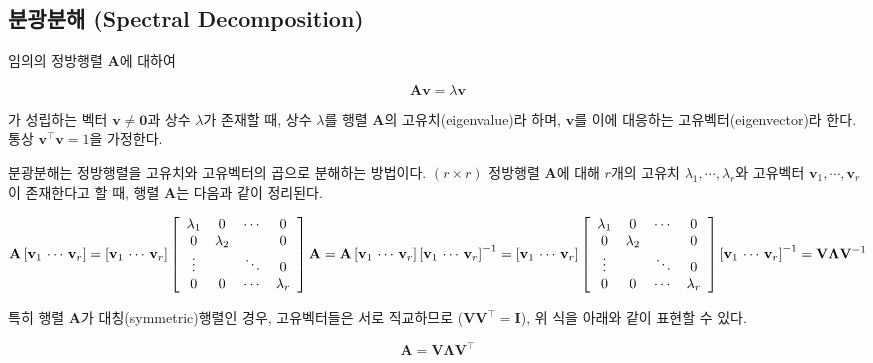 \documentclass[]{book}
\begin{document}
\hypertarget{pca-spectral}{%
\subsection{분광분해 (Spectral Decomposition)}\label{pca-spectral}}

임의의 정방행렬 \(\mathbf{A}\)에 대하여

\[\mathbf{A}\mathbf{v} = \lambda\mathbf{v} \]

가 성립하는 벡터 \(\mathbf{v} \neq \mathbf{0}\)과 상수 \(\lambda\)가 존재할 때, 상수 \(\lambda\)를 행렬 \(\mathbf{A}\)의 고유치(eigenvalue)라 하며, \(\mathbf{v}\)를 이에 대응하는 고유벡터(eigenvector)라 한다. 통상 \(\mathbf{v}^\top \mathbf{v} = 1\)을 가정한다.

분광분해는 정방행렬을 고유치와 고유벡터의 곱으로 분해하는 방법이다. \((r \times r)\) 정방행렬 \(\mathbf{A}\)에 대해 \(r\)개의 고유치 \(\lambda_1, \cdots, \lambda_r\)와 고유벡터 \(\mathbf{v}_1, \cdots, \mathbf{v}_r\)이 존재한다고 할 때, 행렬 \(\mathbf{A}\)는 다음과 같이 정리된다.

\[
\mathbf{A}\left[\mathbf{v}_1 \, \cdots \, \mathbf{v}_r\right] = \left[\mathbf{v}_1 \, \cdots \, \mathbf{v}_r\right] \left[ \begin{array}{c c c c}
\lambda_1 & 0 & \cdots & 0\\
0 & \lambda_2 &  & 0\\
\vdots &  & \ddots & 0\\
0 & 0 & \cdots & \lambda_r
\end{array} \right] \\
\mathbf{A} = \mathbf{A} \left[\mathbf{v}_1 \, \cdots \, \mathbf{v}_r\right] \left[\mathbf{v}_1 \, \cdots \, \mathbf{v}_r\right]^{-1} = \left[\mathbf{v}_1 \, \cdots \, \mathbf{v}_r\right] \left[ \begin{array}{c c c c}
\lambda_1 & 0 & \cdots & 0\\
0 & \lambda_2 &  & 0\\
\vdots &  & \ddots & 0\\
0 & 0 & \cdots & \lambda_r
\end{array} \right] \left[\mathbf{v}_1 \, \cdots \, \mathbf{v}_r\right]^{-1} = \mathbf{V} \mathbf{\Lambda} \mathbf{V}^{-1}
\]

특히 행렬 \(\mathbf{A}\)가 대칭(symmetric)행렬인 경우, 고유벡터들은 서로 직교하므로 (\(\mathbf{V}\mathbf{V}^\top = \mathbf{I}\)), 위 식을 아래와 같이 표현할 수 있다.

\[ \mathbf{A} = \mathbf{V} \mathbf{\Lambda} \mathbf{V}^\top \]
\end{document}
